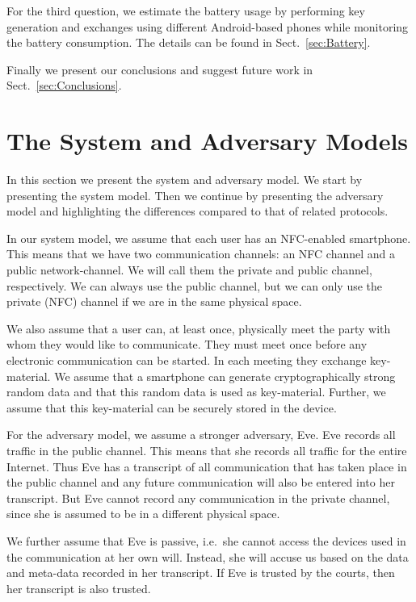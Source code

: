 For the third question, we estimate the battery usage by performing key 
generation and exchanges using different Android-based phones while monitoring 
the battery consumption.
The details can be found in Sect.~\ref{sec:Battery}.

Finally we present our conclusions and suggest future work in 
Sect.~\ref{sec:Conclusions}.


\section{The System and Adversary Models}

In this section we present the system and adversary model.
We start by presenting the system model.
Then we continue by presenting the adversary model and highlighting the 
differences compared to that of related protocols.

In our system model, we assume that each user has an \ac{NFC}-enabled 
smartphone.
This means that we have two communication channels: an \ac{NFC} channel and 
a public network-channel.
We will call them the private and public channel, respectively.
We can always use the public channel, but we can only use the private 
(\ac{NFC}) channel if we are in the same physical space.

We also assume that a user can, at least once, physically meet the party with 
whom they would like to communicate.
They must meet once before any electronic communication can be started.
In each meeting they exchange key-material.
We assume that a smartphone can generate cryptographically strong random data 
and that this random data is used as key-material.
Further, we assume that this key-material can be securely stored in the device.

For the adversary model, we assume a stronger adversary, Eve.
Eve records all traffic in the public channel.
This means that she records all traffic for the entire Internet.
Thus Eve has a transcript of all communication that has taken place in the 
public channel and any future communication will also be entered into her 
transcript.
But Eve cannot record any communication in the private channel, since she is 
assumed to be in a different physical space.

We further assume that Eve is passive, i.e.~she cannot access the devices used 
in the communication at her own will.
Instead, she will accuse us based on the data and meta-data recorded in her 
transcript.
If Eve is trusted by the courts, then her transcript is also trusted.


